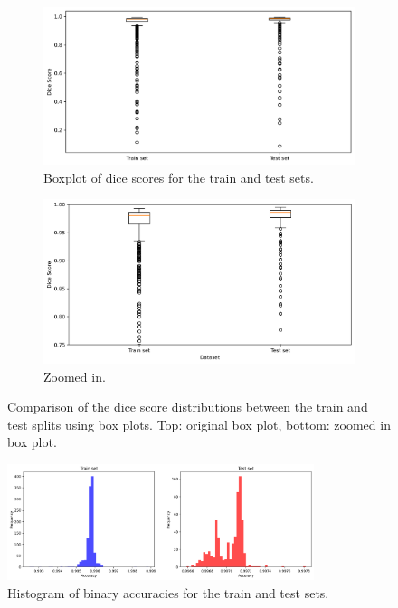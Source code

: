 \documentclass[11pt]{article}
\begin{document}
\begin{figure}[H]
    \centering
    \begin{subfigure}[t]{0.8\textwidth}
        \includegraphics[width=\textwidth]{figs/dice_score_boxplot.png}
        \caption{Boxplot of dice scores for the train and test sets.}
        \label{fig:dice_dist_box_orig}
    \end{subfigure}
    \hfill
    \begin{subfigure}[t]{0.8\textwidth}
        \includegraphics[width=\textwidth]{figs/zoomed_dice_score_boxplot.png}
        \caption{Zoomed in.}
        \label{fig:dice_dist_box_zoomed}
    \end{subfigure}
    \caption{Comparison of the dice score distributions between the train and test splits using box plots. Top: original box plot, bottom: zoomed in box plot.}
    \label{fig:dice_dist_box}
\end{figure}

\begin{figure}[H]
    \centering
    \includegraphics[width=0.8\textwidth]{figs/accuracy_histograms.png}
    \caption{Histogram of binary accuracies for the train and test sets.}
    \label{fig:accuracy_dist_hist}
\end{figure}
\end{document}

